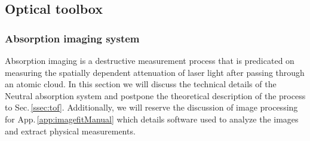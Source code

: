 %
%
%

\pagebreak
\subsection{Optical toolbox} \label{ssec:op_tools}
\subsubsection{Absorption imaging system}
Absorption imaging is a destructive measurement process that is predicated on measuring the spatially dependent attenuation of laser light after passing through an atomic cloud. 
In this section we will discuss the technical details of the Neutral absorption system and postpone the theoretical description of the process to Sec.\,\ref{ssec:tof}.
Additionally, we will reserve the discussion of image processing for App.\,\ref{app:imagefitManual} which details software used to analyze the images and extract physical measurements.

